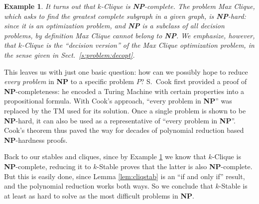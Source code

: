 \documentclass[a4paper]{book}
\theoremstyle{changebreak}                %
\newtheorem{eg}[result]{Example}
\begin{document}
\begin{eg}
\label{eg:nphard}
It turns out that {\sc $k$-Clique}
is {\bf NP}-complete. The problem {\sc Max Clique}, which asks to find the greatest complete
subgraph in a given graph, is {\bf NP}-hard:
since it is an optimization problem, and {\bf NP} is a subclass of all
decision problems, by definition {\sc Max Clique} cannot belong to
{\bf NP}. We emphasize, however, that {\sc $k$-Clique}
is the ``decision version'' of the {\sc Max Clique} optimization
problem, in the sense given in Sect.~\ref{s:problem:decopt}.
\end{eg}

This leaves us with just one basic question: how can we possibly hope
to reduce {\it every problem} in {\bf NP} to a specific problem $P$?
S.~Cook first provided a proof of {\bf
  NP}-completeness: he encoded a Turing Machine
with certain properties into a propositional
formula. With Cook's approach, ``every
problem in {\bf NP}'' was replaced by the TM used for its
solution. Once a single problem is shown to be {\bf NP}-hard, it can
also be used as a representative of ``every problem in {\bf
  NP}''. Cook's theorem thus paved the way for decades of polynomial
reduction based {\bf NP}-hardness proofs.

Back to our stables and cliques, since by Example \ref{eg:nphard} we
know that {\sc $k$-Clique} is {\bf
  NP}-complete, reducing it to {\sc $k$-Stable} proves that the latter is also {\bf NP}-complete. But
this is easily done, since Lemma \ref{lem:cliqstab} is an ``if and
only if'' result, and the polynomial reduction works both ways. So we
conclude that {\sc $k$-Stable} is at least as hard to solve as the
most difficult problems in {\bf NP}. 
\end{document}

